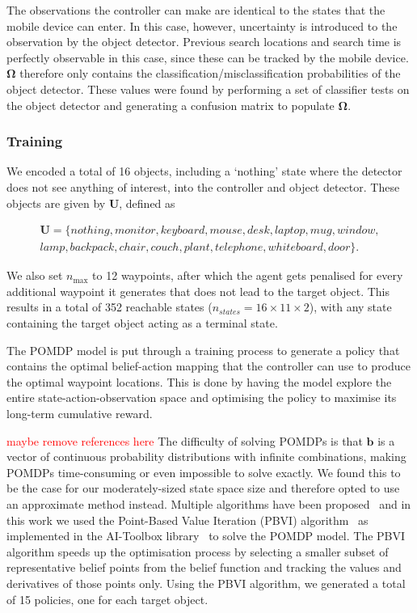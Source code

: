 \documentclass[runningheads]{llncs}
\newcommand\todo[1]{\textcolor{red}{#1}}
\begin{document}
The observations the controller can make are identical to the states that the mobile device can enter. 
In this case, however, uncertainty is introduced to the observation by the object detector.
Previous search locations and search time is perfectly observable in this case, since these can be tracked by the mobile device.
$\mathbf{\Omega}$ therefore only contains the classification/misclassification probabilities of the object detector. 
These values were found by performing a set of classifier tests on the object detector and generating a confusion matrix to populate $\mathbf{\Omega}$.

\subsubsection{Training}

We encoded a total of 16 objects, including a `nothing' state where the detector does not see anything of interest, into the controller and object detector.
These objects are given by $\mathbf{U}$, defined as 

\begin{equation*}
  \begin{split}
    \mathbf{U} = \{ nothing, monitor, keyboard, mouse, desk, laptop, mug, window,\\ 
      lamp, backpack, chair, couch, plant, telephone, whiteboard, door \}.
  \end{split}
\end{equation*}

We also set $n_{\max}$ to 12 waypoints, after which the agent gets penalised for every additional waypoint it generates that does not lead to the target object. 
This results in a total of 352 reachable states ($n_{states} = 16\times11\times2$), with any state containing the target object acting as a terminal state.

The POMDP model is put through a training process to generate a policy that contains the optimal belief-action mapping that the controller can use to produce the optimal waypoint locations.
This is done by having the model explore the entire state-action-observation space and optimising the policy to maximise its long-term cumulative reward.

\todo{maybe remove references here}
The difficulty of solving POMDPs is that $\mathbf{b}$ is a vector of continuous probability distributions with infinite combinations, making POMDPs time-consuming or even impossible to solve exactly.
We found this to be the case for our moderately-sized state space size and therefore opted to use an approximate method instead.
Multiple algorithms have been proposed~\cite{bargiacchi2016dynamic,kaelbling1998planning,silver2010monte,spaan2005perseus} and in this work we used the Point-Based Value Iteration (PBVI) algorithm~\cite{pineau2003point} as implemented in the AI-Toolbox library~\cite{aitoolbox} to solve the POMDP model.
The PBVI algorithm speeds up the optimisation process by selecting a smaller subset of representative belief points from the belief function and tracking the values and derivatives of those points only. 
Using the PBVI algorithm, we generated a total of 15 policies, one for each target object. 
\end{document}
